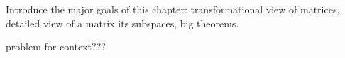 \documentclass[elementsmain.tex]{subfiles}
\begin{document}
Introduce the major goals of this chapter: transformational view of matrices, detailed view of a matrix its subspaces, big theorems.

problem for context???

\clearpage
\end{document}
